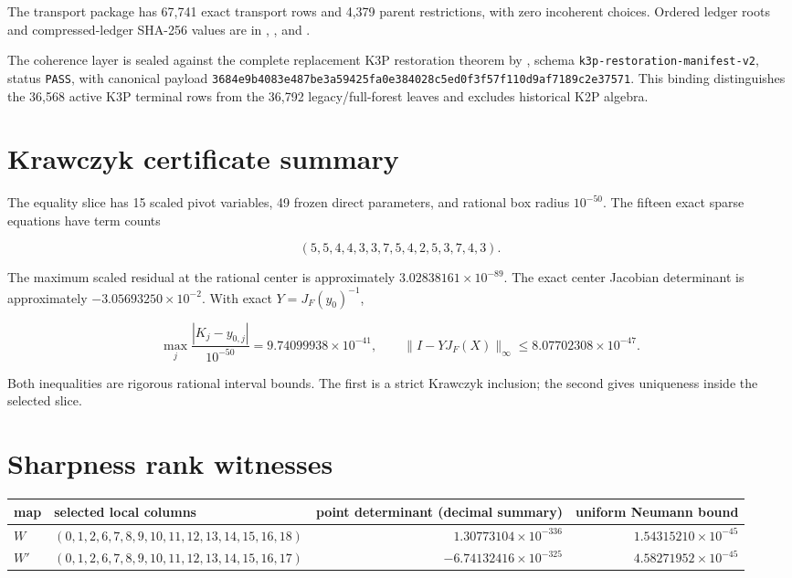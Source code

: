 \documentclass[10pt]{article}
\newcommand{\sha}[1]{\nolinkurl{#1}}
\begin{document}
The transport package has 67,741 exact transport rows and 4,379
parent restrictions, with zero incoherent choices.  Ordered ledger roots and
compressed-ledger SHA-256 values are in
,
, and
.

The coherence layer is sealed against the complete replacement K3P
restoration theorem by , schema
\texttt{k3p-restoration-manifest-v2}, status \texttt{PASS}, with canonical
payload
\sha{3684e9b4083e487be3a59425fa0e384028c5ed0f3f57f110d9af7189c2e37571}.
This binding distinguishes the 36,568 active K3P terminal rows from the
36,792 legacy/full-forest leaves and excludes historical K2P algebra.

\section{Krawczyk certificate summary}

The equality slice has 15 scaled pivot variables, 49 frozen direct
parameters, and rational box radius \(10^{-50}\).  The fifteen exact sparse
equations have term counts

\[
(5,5,4,4,3,3,7,5,4,2,5,3,7,4,3).
\]

The maximum scaled residual at the rational center is approximately
\(3.02838161\times10^{-89}\).  The exact center Jacobian determinant is
approximately \(-3.05693250\times10^{-2}\).  With exact
\(Y=J_F(y_0)^{-1}\),

\[
\max_j\frac{|K_j-y_{0,j}|}{10^{-50}}
=9.74099938\times10^{-41},\qquad
\lVert I-YJ_F(X)\rVert_\infty\le8.07702308\times10^{-47}.
\]

Both inequalities are rigorous rational interval bounds.  The first is a
strict Krawczyk inclusion; the second gives uniqueness inside the selected
slice.

\section{Sharpness rank witnesses}

\begin{center}
\begingroup
\scriptsize
\setlength{\tabcolsep}{3pt}
\begin{tabular}{lL{.42\linewidth}rr}
\toprule
map & selected local columns & point determinant (decimal summary) & uniform Neumann bound\\
\midrule
\(W\) & \((0,1,2,6,7,8,9,10,11,12,13,14,15,16,18)\)
& \(1.30773104\times10^{-336}\) & \(1.54315210\times10^{-45}\)\\
\(W'\) & \((0,1,2,6,7,8,9,10,11,12,13,14,15,16,17)\)
& \(-6.74132416\times10^{-325}\) & \(4.58271952\times10^{-45}\)\\
\bottomrule
\end{tabular}
\endgroup
\end{center}
\end{document}
